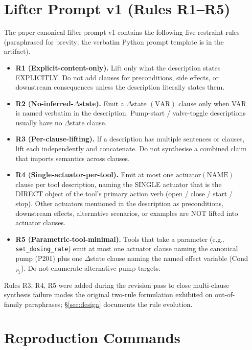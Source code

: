 \section{Lifter Prompt v1 (Rules R1--R5)}
\label{app:prompt}

The paper-canonical lifter prompt v1 contains the following five
restraint rules (paraphrased for brevity; the verbatim Python prompt
template is in the artifact).

\begin{itemize}\itemsep0pt
\item \textbf{R1 (Explicit-content-only).} Lift only what the
  description states EXPLICITLY. Do not add clauses for preconditions,
  side effects, or downstream consequences unless the description
  literally states them.
\item \textbf{R2 (No-inferred-$\Delta$state).} Emit a $\Delta$state
  $(\text{VAR})$ clause only when VAR is named verbatim in the
  description. Pump-start / valve-toggle descriptions usually have
  no $\Delta$state clause.
\item \textbf{R3 (Per-clause-lifting).} If a description has multiple
  sentences or clauses, lift each independently and concatenate. Do
  not synthesise a combined claim that imports semantics across
  clauses.
\item \textbf{R4 (Single-actuator-per-tool).} Emit at most one
  $\text{actuator}(\text{NAME})$ clause per tool description, naming
  the SINGLE actuator that is the DIRECT object of the tool's
  primary action verb (open / close / start / stop). Other actuators
  mentioned in the description as preconditions, downstream effects,
  alternative scenarios, or examples are NOT lifted into actuator
  clauses.
\item \textbf{R5 (Parametric-tool-minimal).} Tools that take a
  parameter (e.g., \texttt{set\_dosing\_rate}) emit at most one
  actuator clause naming the canonical pump (P201) plus one
  $\Delta$state clause naming the named effect variable
  (Cond$_{P_2}$). Do not enumerate alternative pump targets.
\end{itemize}

Rules R3, R4, R5 were added during the revision pass to close
multi-clause synthesis failure modes the original two-rule
formulation exhibited on out-of-family paraphrases; \S\ref{sec:design}
documents the rule evolution.

\section{Reproduction Commands}
\label{app:reproduce}

